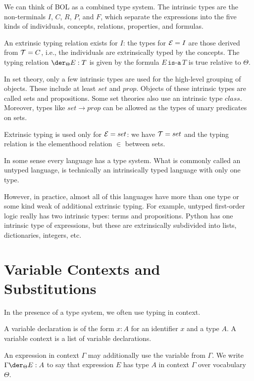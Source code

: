 \begin{example}
We can think of BOL as a combined type system.
The intrinsic types are the non-terminals $I$, $C$, $R$, $P$, and $F$, which separate the expressions into the five kinds of individuals, concepts, relations, properties, and formulas.

An extrinsic typing relation exists for $I$: the types for $\mathcal{E}=I$ are those derived from $\mathcal{T}=C$, i.e., the individuals are extrinsically typed by the concepts.
The typing relation $\der_\Theta E:T$ is given by the formula $E\,\texttt{is-a}\,T$ is true relative to $\Theta$.
\end{example}

\begin{example}
In set theory, only a few intrinsic types are used for the high-level grouping of objects.
These include at least $set$ and $prop$.
Objects of these intrinsic types are called sets and propositions.
Some set theories also use an intrinsic type $class$.
Moreover, types like $set\to prop$ can be allowed as the types of unary predicates on sets.

Extrinsic typing is used only for $\mathcal{E}=set$: we have $\mathcal{T}=set$ and the typing relation is the elementhood relation $\in$ between sets.
\end{example}

\begin{example}
In some sense every language has a type system.
What is commonly called an untyped language, is technically an intrinsically typed language with only one type.

However, in practice, almost all of this languages have more than one type or some kind weak of additional extrinsic typing.
For example, untyped first-order logic really has two intrinsic types: terms and propositions.
Python has one intrinsic type of expressions, but these are extrinsically subdivided into lists, dictionaries, integers, etc.
\end{example}


\section{Variable Contexts and Substitutions}

In the presence of a type system, we often use typing in context.

\begin{definition}[Context]
A variable declaration is of the form $x:A$ for an identifier $x$ and a type $A$.
A variable context is a list of variable declarations.

An expression in context $\Gamma$ may additionally use the variable from $\Gamma$.
We write $\Gamma \der_\Theta E:A$ to say that expression $E$ has type $A$ in context $\Gamma$ over vocabulary $\Theta$.
\end{definition}

